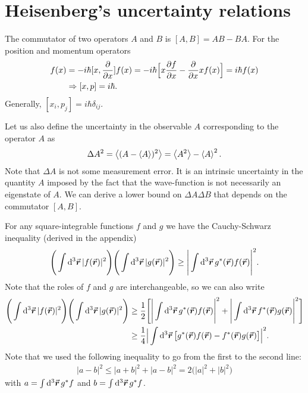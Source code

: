 \section{Heisenberg's uncertainty relations}

The commutator of two operators $A$ and $B$ is $[A,B] = AB - BA$.
For the position and momentum operators
\begin{align}
    [x,p] f(x) &= -i\hbar [x,\pdv{x}] f(x) = -i \hbar \Big[ x \pdv{f}{x} - \pdv{x} x f(x) \Big] = i\hbar f(x) \\
               &\Rightarrow [x,p] = i\hbar
.\end{align}
Generally, $[x_{i},p_{j}] = i\hbar \delta_{ij}$.

Let us also define the uncertainty in the observable $A$ corresponding to the operator $A$ as
\begin{eqnarray}
    \Delta A^2 = \expval{(A - \expval{A})^2} = \expval{A^2} - \expval{A}^2
.\end{eqnarray}
Note that $\Delta A$ is not some measurement error.
It is an intrinsic uncertainty in the quantity $A$ imposed by the fact that the wave-function is not necessarily an eigenstate of $A$.
We can derive a lower bound on $\Delta A \Delta B$ that depends on the commutator $[A,B]$.

For any square-integrable functions $f$ and $g$ we have the Cauchy-Schwarz inequality (derived in the appendix)
\begin{eqnarray}
    \Bigg( \int \dd[3]{\va*{r}} |f(\va*{r})|^2 \Bigg) \Bigg( \int \dd[3]{\va*{r}} |g(\va*{r})|^2 \Bigg) \geq \Bigg| \int \dd[3]{\va*{r}} g^{*}(\va*{r}) f(\va*{r}) \Bigg|^2
.\end{eqnarray}
Note that the roles of $f$ and $g$ are interchangeable, so we can also write
\begin{align} 
        \Bigg( \int \dd[3]{\va*{r}} |f(\va*{r})|^2 \Bigg) \Bigg( \int \dd[3]{\va*{r}} |g(\va*{r})|^2 \Bigg) &\geq \frac{1}{2} \Bigg[ \Bigg| \int \dd[3]{\va*{r}} g^{*}(\va*{r}) f(\va*{r}) \Bigg|^2 + \Bigg| \int \dd[3]{\va*{r}} f^{*}(\va*{r}) g(\va*{r}) \Bigg|^2 \Bigg] \nonumber \\
        &\geq \frac{1}{4} \Big| \int \dd[3]{\va*{r}} \big[ g^{*}(\va*{r}) f(\va*{r}) - f^{*}(\va*{r}) g(\va*{r}) \big] \Big|^2
.\end{align}
Note that we used the following inequality to go from the first to the second line:
\begin{eqnarray}
    |a - b|^2 \leq |a + b|^2 + |a - b|^2 = 2 \big( |a|^2 + |b|^2 \big)
\end{eqnarray}
with $a = \int \dd[3]{\va*{r}} g^{*} f$ and $b = \int \dd[3]{\va*{r}} g^{*} f$.

